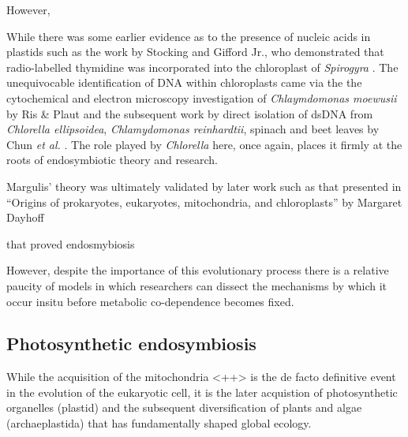 However,  















While there was some earlier evidence as to the presence of nucleic acids in 
plastids such as the work by Stocking and Gifford Jr., who demonstrated that
radio-labelled thymidine was incorporated into the chloroplast of \textit{Spirogyra}
\citep{Stocking1959}.
The unequivocable identification of DNA within chloroplasts came via the 
the cytochemical and electron microscopy investigation of \textit{Chlaymdomonas moewusii} 
by Ris \& Plaut \citep{Ris1962} and the subsequent work by direct isolation of
dsDNA from \textit{Chlorella ellipsoidea}, \textit{Chlamydomonas reinhardtii}, spinach
and beet leaves by Chun \textit{et al.} \citep{Chun1963}. The role played by
\textit{Chlorella} here, once again, places it firmly at the roots of endosymbiotic
theory and research.






Margulis' theory was ultimately validated by later work such as that presented in 
``Origins of prokaryotes, eukaryotes, mitochondria, and chloroplasts'' by Margaret Dayhoff 

that proved endosmybiosis \citep{Schwartz1976}



However, despite the importance of this evolutionary process there is a relative
paucity of models in which researchers can dissect the mechanisms by which it occur
in\-situ before metabolic co-dependence becomes fixed.










\subsection{Photosynthetic endosymbiosis}

While the acquisition of the mitochondria <++> %
is the de facto definitive event in the evolution of the eukaryotic cell, 
it is the later acquistion of photosynthetic organelles (plastid) and the subsequent 
diversification of plants and algae (archaeplastida) that has fundamentally shaped global ecology.


